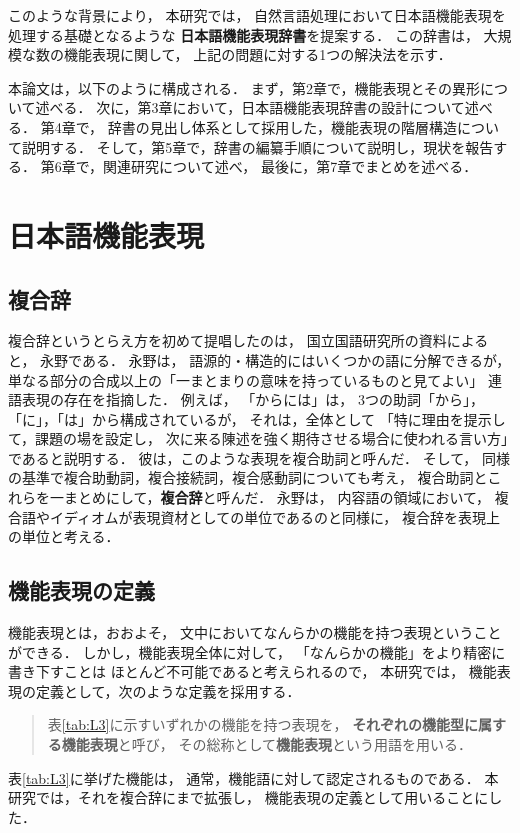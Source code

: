 \documentclass[japanese]{jnlp_1.3e}
\begin{document}
このような背景により，
本研究では，
自然言語処理において日本語機能表現を処理する基礎となるような
{\bf 日本語機能表現辞書}を提案する．
この辞書は，
大規模な数の機能表現に関して，
上記の問題に対する1つの解決法を示す．

本論文は，以下のように構成される．
まず，第2章で，機能表現とその異形について述べる．
次に，第3章において，日本語機能表現辞書の設計について述べる．
第4章で，
辞書の見出し体系として採用した，機能表現の階層構造について説明する．
そして，第5章で，辞書の編纂手順について説明し，現状を報告する．
第6章で，関連研究について述べ，
最後に，第7章でまとめを述べる．




\section{日本語機能表現}

\subsection{複合辞}

複合辞というとらえ方を初めて提唱したのは，
国立国語研究所の資料によると，
永野である．
永野は，
語源的・構造的にはいくつかの語に分解できるが，
単なる部分の合成以上の「一まとまりの意味を持っているものと見てよい」
連語表現の存在を指摘した．
例えば，
「からには」は，
3つの助詞「から」，「に」，「は」から構成されているが，
それは，全体として
「特に理由を提示して，課題の場を設定し，
次に来る陳述を強く期待させる場合に使われる言い方」であると説明する．
彼は，このような表現を複合助詞と呼んだ．
そして，
同様の基準で複合助動詞，複合接続詞，複合感動詞についても考え，
複合助詞とこれらを一まとめにして，{\bf 複合辞}と呼んだ．
永野は，
内容語の領域において，
複合語やイディオムが表現資材としての単位であるのと同様に，
複合辞を表現上の単位と考える．

\subsection{機能表現の定義}
\label{subsec:definition}

\begin{table}[b]

\end{table}

機能表現とは，おおよそ，
文中においてなんらかの機能を持つ表現ということができる． 
しかし，機能表現全体に対して，
「なんらかの機能」をより精密に書き下すことは
ほとんど不可能であると考えられるので，
本研究では，
機能表現の定義として，次のような定義を採用する．
\begin{quote}
表\ref{tab:L3}に示すいずれかの機能を持つ表現を，
{\bf それぞれの機能型に属する機能表現}と呼び，
その総称として{\bf 機能表現}という用語を用いる．
\end{quote}
表\ref{tab:L3}に挙げた機能は，
通常，機能語に対して認定されるものである．
本研究では，それを複合辞にまで拡張し，
機能表現の定義として用いることにした．
\end{document}
